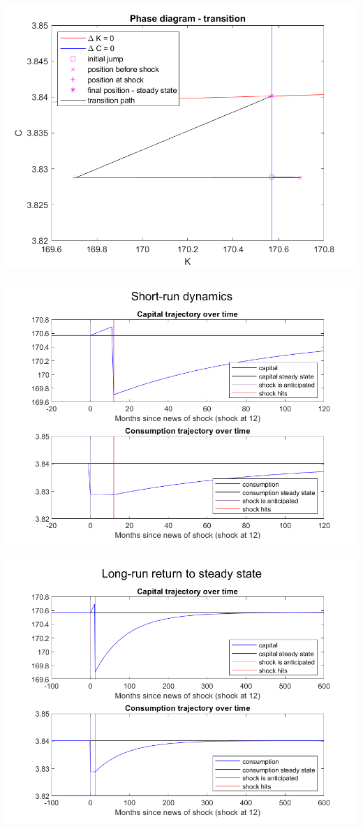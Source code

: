 \documentclass[11pt]{article} %
\begin{document}
 \includegraphics{phtr}

\includegraphics{shortrun}

\includegraphics{longrun}
\end{document}
